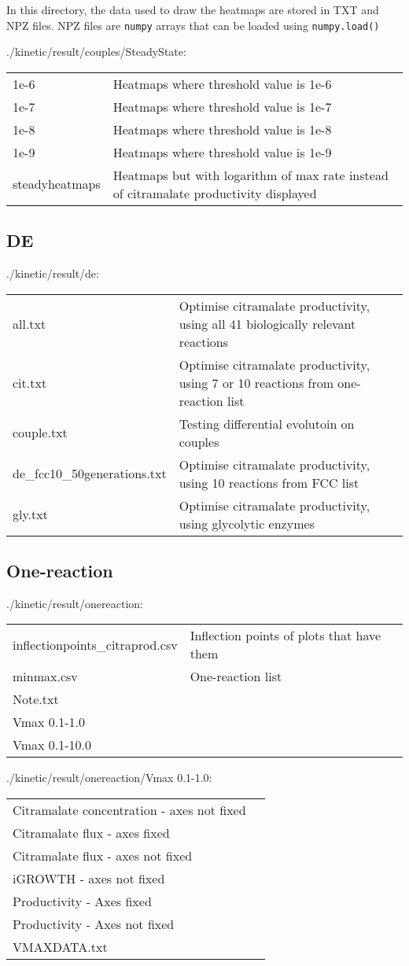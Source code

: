 \documentclass[a4paper, parskip=full]{scrreprt}
\begin{document}
In this directory, the data used to draw the heatmaps are stored in TXT and NPZ files. NPZ files are \texttt{numpy} arrays that can be loaded using \texttt{numpy.load()}

./kinetic/result/couples/SteadyState:

\begin{longtable}{ll}
1e-6 & Heatmaps where threshold value is 1e-6\\
1e-7 & Heatmaps where threshold value is 1e-7\\
1e-8 & Heatmaps where threshold value is 1e-8\\
1e-9 & Heatmaps where threshold value is 1e-9\\
steadyheatmaps & Heatmaps but with logarithm of max rate instead of citramalate productivity displayed
\end{longtable}

\subsection{DE}
\label{ssec:de}

./kinetic/result/de:

\begin{longtable}{ll}
all.txt & Optimise citramalate productivity, using all 41 biologically relevant reactions\\
cit.txt & Optimise citramalate productivity, using 7 or 10 reactions from one-reaction list\\
couple.txt & Testing differential evolutoin on couples\\
de\_fcc10\_50generations.txt & Optimise citramalate productivity, using 10 reactions from FCC list\\
gly.txt & Optimise citramalate productivity, using glycolytic enzymes
\end{longtable}

\subsection{One-reaction}
\label{ssec:onereaction}

./kinetic/result/onereaction:

\begin{longtable}{ll}
inflectionpoints\_citraprod.csv & Inflection points of plots that have them\\
minmax.csv & One-reaction list\\
Note.txt\\
Vmax 0.1-1.0\\
Vmax 0.1-10.0\\
\end{longtable}

./kinetic/result/onereaction/Vmax 0.1-1.0:

\begin{longtable}{ll}
Citramalate concentration - axes not fixed\\
Citramalate flux - axes fixed\\
Citramalate flux - axes not fixed\\
iGROWTH - axes not fixed\\
Productivity - Axes fixed\\
Productivity - Axes not fixed\\
VMAXDATA.txt\\
\end{longtable}
\end{document}

